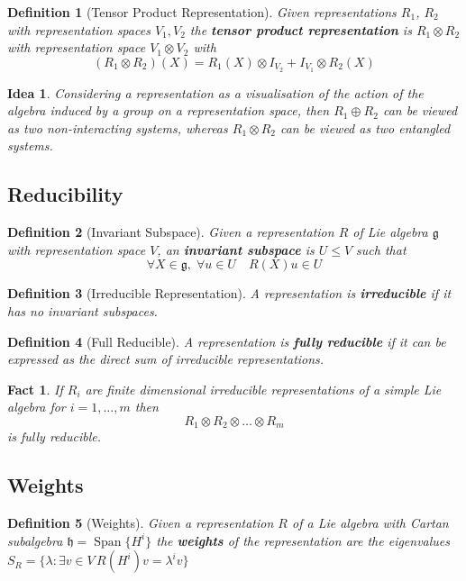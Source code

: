 \documentclass{article}
\newtheorem{definition}{Definition}[subsection]
\newtheorem{fact}{Fact}[subsection]
\newtheorem*{idea}{Idea}
\DeclareMathOperator{\spn}{Span}
\newcommand{\bam}[1]{\textbf{#1}}
\newcommand{\mf}[1]{\mathfrak{#1}}
\begin{document}
\begin{definition}[Tensor Product Representation]
Given representations $R_1$, $R_2$ with representation spaces $V_1, V_2$ the \bam{tensor product representation} is $R_1 \otimes R_2$ with representation space $V_1 \otimes V_2$ with
\[
(R_1 \otimes R_2)(X)=R_1(X)\otimes I_{V_2}+I_{V_1}\otimes R_2(X)
\]
\end{definition}

\begin{idea}
Considering a representation as a visualisation of the action of the algebra induced by a  group on a representation space, then $R_1 \oplus R_2$ can be viewed as two non-interacting systems, whereas $R_1 \otimes R_2$ can be viewed as two entangled systems.
\end{idea}

\subsection{Reducibility}
\begin{definition}[Invariant Subspace]
Given a representation $R$ of Lie algebra $\mf{g}$ with representation space $V$, an \bam{invariant subspace} is $U\leq V$ such that
\[
\forall X\in\mf{g}, \; \forall u\in U \quad R\left(X\right)u\in U
\]
\end{definition}

\begin{definition}[Irreducible Representation]
A representation is \bam{irreducible} if it has no invariant subspaces. 
\end{definition}

\begin{definition}[Full Reducible]
A representation is \bam{fully reducible} if it can be expressed as the direct sum of irreducible representations. 
\end{definition}

\begin{fact}
If $R_i$ are finite dimensional irreducible representations of a simple Lie algebra for $i=1,\dots,m$ then
\[
R_1 \otimes R_2 \otimes \dots \otimes R_m
\]
is fully reducible. 
\end{fact}

\subsection{Weights}
\begin{definition}[Weights]
Given a representation $R$ of a Lie algebra with Cartan subalgebra $\mf{h}=\spn\lbrace H^i \rbrace$ the \bam{weights} of the representation are the eigenvalues $S_R=\lbrace \lambda : \exists v\in V \, R(H^i)v=\lambda^i v\rbrace$
\end{definition}
\end{document}
